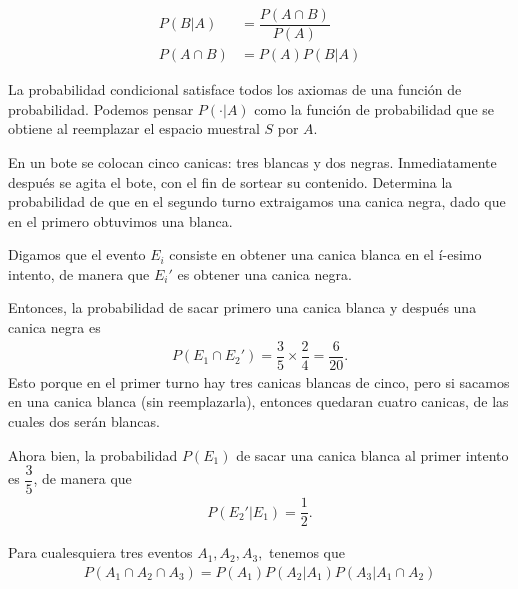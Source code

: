 \begin{definicion}
	\begin{align}
		P(B|A)&=\dfrac{P(A\cap B)}{P(A)} \\
		P(A\cap B) &= P(A)P(B|A)
	\end{align}
\end{definicion}


\begin{observacion}
	La probabilidad condicional satisface todos los axiomas de una función de probabilidad.  Podemos pensar $P(\cdot|A)$ como la función de probabilidad que se obtiene al reemplazar el espacio muestral $S$ por $A.$
\end{observacion}

\begin{ejemplo}
	En un bote se colocan cinco canicas: tres blancas y dos negras. Inmediatamente después se agita el bote, con el fin de sortear su contenido. Determina la probabilidad de que en el segundo turno extraigamos una canica negra, dado que en el primero obtuvimos una blanca.  
\end{ejemplo}

\begin{solucion}
	Digamos que el evento $ E_i $ consiste en obtener una canica blanca en el í-esimo intento, de manera que $ E_i' $ es obtener una canica negra. 
	
	Entonces, la probabilidad de sacar primero una canica blanca y después una canica negra es 
	\begin{align}
		P(E_1\cap E_2') = \dfrac{3}{5}\times \dfrac{2}{4}=\dfrac{6}{20}.
	\end{align}
	Esto porque en el primer turno hay tres canicas blancas de cinco, pero si sacamos en una canica blanca (sin reemplazarla), entonces quedaran cuatro canicas, de las cuales dos serán blancas. 
	
	Ahora bien, la probabilidad $ P(E_1) $ de sacar una canica blanca al primer intento es $ \dfrac{3}{5} $, de manera que 
	\begin{align}
		P(E_2'|E_1) = \dfrac{1}{2}.
	\end{align}
\end{solucion}





{}
\begin{teorema}
	\label{thm:1.9}
	Para cualesquiera tres eventos $A_{1},A_{2},A_{3},$ tenemos que
	\begin{align}
		\label{1.19}
		P(A_{1} \cap A_{2} \cap A_{3})=P(A_{1})P(A_{2}|A_{1})P(A_{3}|A_{1} \cap A_{2})
	\end{align}
\end{teorema}


